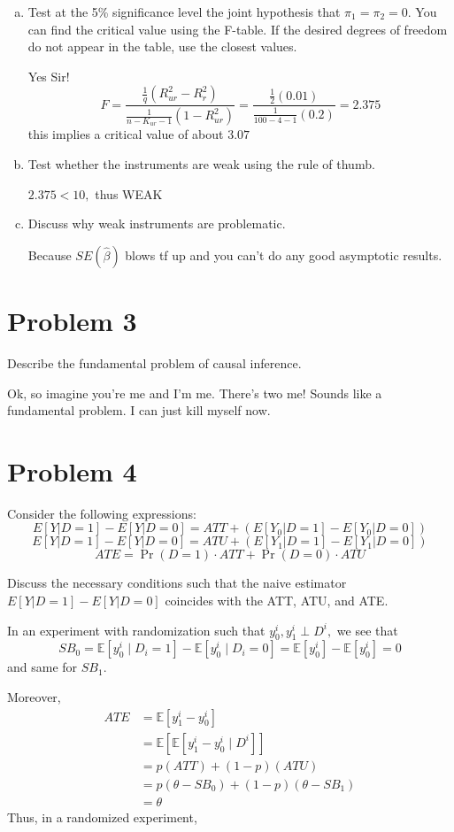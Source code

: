 \documentclass[11pt]{article}
\newcommand{\bbE}{\mathbb{E}}
\begin{document}
\begin{enumerate}[(a)]
    \item Test at the 5\% significance level the joint hypothesis that \( \pi_1 = \pi_2 = 0 \). You can find the critical value using the F-table. If the desired degrees of freedom do not appear in the table, use the closest values.
    \begin{solution}
        Yes Sir! 
        \[F = \frac{\frac{1}{q}(R^2_{ur} - R^2_r)}{\frac{1}{n-K_{ur} - 1}(1 - R^2_{ur})} = \frac{\frac{1}{2}(0.01)}{\frac{1}{100-4 - 1}(0.2)} = 2.375\] this implies a critical value of about $3.07$
    \end{solution}
    \item Test whether the instruments are weak using the rule of thumb.
    \begin{solution}
        $2.375 < 10,$ thus WEAK
    \end{solution}
    \item Discuss why weak instruments are problematic.
    \begin{solution}
        Because $SE(\hat\beta)$ blows tf up and you can't do any good asymptotic results. 
    \end{solution}
\end{enumerate}

\newpage
\section*{Problem 3}
Describe the fundamental problem of causal inference.
\begin{solution}
    Ok, so imagine you're me and I'm me. There's two me! Sounds like a fundamental problem. I can just kill myself now. 
\end{solution}

\newpage
\section*{Problem 4}
Consider the following expressions:
\[
E[Y | D = 1] - E[Y | D = 0] = ATT + \left(E[Y_0 | D = 1] - E[Y_0 | D = 0]\right)
\]
\[
E[Y | D = 1] - E[Y | D = 0] = ATU + \left(E[Y_1 | D = 1] - E[Y_1 | D = 0]\right)
\]
\[
ATE = \Pr(D = 1) \cdot ATT + \Pr(D = 0) \cdot ATU
\]

Discuss the necessary conditions such that the naive estimator \( E[Y | D = 1] - E[Y | D = 0] \) coincides with the ATT, ATU, and ATE.
\begin{solution}
    In an experiment with randomization such that $y_0^i, y_1^i \perp D^i,$ we see that 
    \[SB_0 = \bbE[y^i_0 \mid D_i = 1] - \bbE[y^i_0 \mid D_i = 0] = \bbE[y_0^i] - \bbE[y_0^i] = 0\] and same for $SB_1.$

    Moreover, 
    \begin{align*}
    ATE &= \bbE[y_1^i - y_0^i]\\
    &= \bbE[\bbE[y_1^i - y_0^i \mid D^i]]\\
    &= p (ATT) + (1-p)(ATU)\\
    &= p(\theta - SB_0)  + (1-p)(\theta - SB_1)\\
    &= \theta
\end{align*}
Thus, in a randomized experiment, 
\end{solution}
\end{document}
